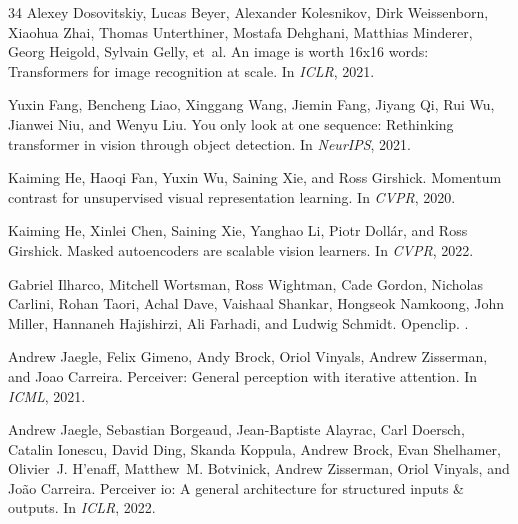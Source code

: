 \documentclass{article} \usepackage{iclr2024_conference,times}
\begin{document}
\begin{thebibliography}{34}
Alexey Dosovitskiy, Lucas Beyer, Alexander Kolesnikov, Dirk Weissenborn,
  Xiaohua Zhai, Thomas Unterthiner, Mostafa Dehghani, Matthias Minderer, Georg
  Heigold, Sylvain Gelly, et~al.
\newblock An image is worth 16x16 words: Transformers for image recognition at
  scale.
\newblock In \emph{ICLR}, 2021.

Yuxin Fang, Bencheng Liao, Xinggang Wang, Jiemin Fang, Jiyang Qi, Rui Wu,
  Jianwei Niu, and Wenyu Liu.
\newblock You only look at one sequence: Rethinking transformer in vision
  through object detection.
\newblock In \emph{NeurIPS}, 2021.

Kaiming He, Haoqi Fan, Yuxin Wu, Saining Xie, and Ross Girshick.
\newblock Momentum contrast for unsupervised visual representation learning.
\newblock In \emph{CVPR}, 2020.

Kaiming He, Xinlei Chen, Saining Xie, Yanghao Li, Piotr Doll{\'a}r, and Ross
  Girshick.
\newblock Masked autoencoders are scalable vision learners.
\newblock In \emph{CVPR}, 2022.

Gabriel Ilharco, Mitchell Wortsman, Ross Wightman, Cade Gordon, Nicholas
  Carlini, Rohan Taori, Achal Dave, Vaishaal Shankar, Hongseok Namkoong, John
  Miller, Hannaneh Hajishirzi, Ali Farhadi, and Ludwig Schmidt.
\newblock Openclip.
.

Andrew Jaegle, Felix Gimeno, Andy Brock, Oriol Vinyals, Andrew Zisserman, and
  Joao Carreira.
\newblock Perceiver: General perception with iterative attention.
\newblock In \emph{ICML}, 2021.

Andrew Jaegle, Sebastian Borgeaud, Jean-Baptiste Alayrac, Carl Doersch, Catalin
  Ionescu, David Ding, Skanda Koppula, Andrew Brock, Evan Shelhamer, Olivier~J.
  H'enaff, Matthew~M. Botvinick, Andrew Zisserman, Oriol Vinyals, and Jo{\~a}o
  Carreira.
\newblock Perceiver io: A general architecture for structured inputs \&
  outputs.
\newblock In \emph{ICLR}, 2022.


\end{thebibliography}
\end{document}

